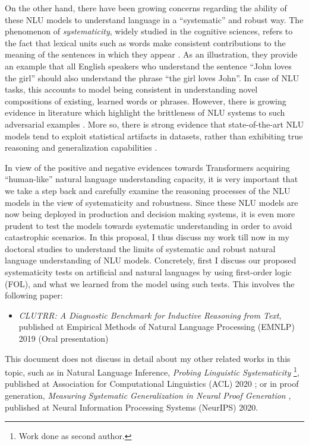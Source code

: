 \documentclass[12pt]{article}
\begin{document}
On the other hand, there have been growing concerns regarding the ability of these NLU models to understand language in a ``systematic'' and robust way. The phenomenon of \textit{systematicity}, widely studied in the cognitive sciences, refers to the fact that lexical units such as words make consistent contributions to the meaning of the sentences in which they appear \CITE[Fodor]. As an illustration, they provide an example that all English speakers who understand the sentence ``John loves the girl'' should also understand the phrase ``the girl loves John''. In case of NLU tasks, this accounts to model being consistent in understanding novel compositions of existing, learned words or phrases. However, there is growing evidence in literature which highlight the brittleness of NLU systems to such adversarial examples \CITE. More so, there is strong evidence that state-of-the-art NLU models tend to exploit statistical artifacts in datasets, rather than exhibiting true reasoning and generalization capabilities \CITE.

In view of the positive and negative evidences towards Transformers acquiring ``human-like'' natural language understanding capacity, it is very important that we take a step back and carefully examine the reasoning processes of the NLU models in the view of systematicity and robustness. Since these NLU models are now being deployed in production and decision making systems, it is even more prudent to test the models towards systematic understanding in order to avoid catastrophic scenarios. In this proposal, I thus discuss my work till now in my doctoral studies to understand the limits of systematic and robust natural language understanding of NLU models. Concretely, first I discuss our proposed systematicity tests on artificial and natural languages by using first-order logic (FOL), and what we learned from the model using such tests. This involves the following paper:

\begin{itemize}
  \item \textit{CLUTRR: A Diagnostic Benchmark for Inductive Reasoning from Text}, published at Empirical Methods of Natural Language Processing (EMNLP) 2019 (Oral presentation) \cite{sinha2019a}
\end{itemize}

This document does not discuss in detail about my other related works in this topic, such as in Natural Language Inference, \textit{Probing Linguistic Systematicity} \footnote{Work done as second author.}, published at Association for Computational Linguistics (ACL) 2020 \cite{goodwin2020}; or in proof generation, \textit{Measuring Systematic Generalization in Neural Proof Generation} \cite{gontier2020}, published at Neural Information Processing Systems (NeurIPS) 2020.
\end{document}
